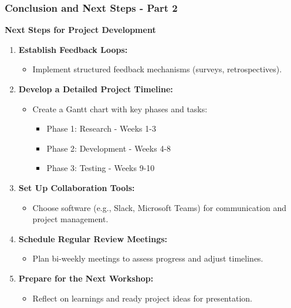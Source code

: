 \documentclass[aspectratio=169]{beamer}
\begin{document}
\begin{frame}[fragile]
  \frametitle{Conclusion and Next Steps - Part 2}
  \textbf{Next Steps for Project Development}
  \begin{enumerate}
    \item \textbf{Establish Feedback Loops:}
    \begin{itemize}
        \item Implement structured feedback mechanisms (surveys, retrospectives).
    \end{itemize}
    
    \item \textbf{Develop a Detailed Project Timeline:}
    \begin{itemize}
        \item Create a Gantt chart with key phases and tasks:
        \begin{itemize}
          \item Phase 1: Research - Weeks 1-3
          \item Phase 2: Development - Weeks 4-8
          \item Phase 3: Testing - Weeks 9-10
        \end{itemize}
    \end{itemize}
    
    \item \textbf{Set Up Collaboration Tools:}
    \begin{itemize}
        \item Choose software (e.g., Slack, Microsoft Teams) for communication and project management.
    \end{itemize}
    
    \item \textbf{Schedule Regular Review Meetings:}
    \begin{itemize}
        \item Plan bi-weekly meetings to assess progress and adjust timelines.
    \end{itemize}
    
    \item \textbf{Prepare for the Next Workshop:}
    \begin{itemize}
        \item Reflect on learnings and ready project ideas for presentation.
    \end{itemize}
  \end{enumerate}
\end{frame}
\end{document}
